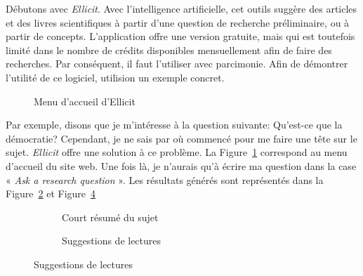 \documentclass[
  letterpaper,
  DIV=11,
  numbers=noendperiod]{scrreprt}
\begin{document}
Débutons avec \emph{Ellicit}. Avec l'intelligence artificielle, cet
outils suggère des articles et des livres scientifiques à partir d'une
question de recherche préliminaire, ou à partir de concepts.
L'application offre une version gratuite, mais qui est toutefois limité
dans le nombre de crédits disponibles mensuellement afin de faire des
recherches. Par conséquent, il faut l'utiliser avec parcimonie. Afin de
démontrer l'utilité de ce logiciel, utilision un exemple concret.

\begin{figure}


\caption{\label{fig-ellicit}Menu d'accueil d'Ellicit}

\end{figure}%

Par exemple, disons que je m'intéresse à la question suivante: Qu'est-ce
que la démocratie? Cependant, je ne sais par où commencé pour me faire
une tête sur le sujet. \emph{Ellicit} offre une solution à ce problème.
La Figure~\ref{fig-ellicit} correspond au menu d'accueil du site web.
Une fois là, je n'aurais qu'à écrire ma question dans la case «
\emph{Ask a research question} ». Les résultats générés sont représentés
dans la Figure~\ref{fig-results1} et Figure~\ref{fig-results2}

\begin{figure}

\begin{minipage}{0.50\linewidth}

\begin{figure}[H]


\caption{\label{fig-results1}Court résumé du sujet}

\end{figure}%

\end{minipage}%
%
\begin{minipage}{0.50\linewidth}

\begin{figure}[H]


\caption{\label{fig-results2}Suggestions de lectures}

\end{figure}%

\end{minipage}%

\end{figure}%
\end{document}
